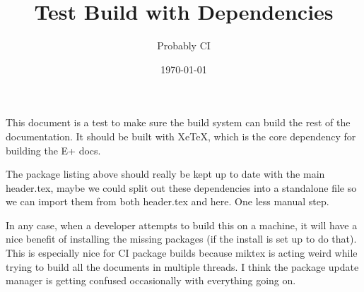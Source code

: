 \documentclass{report}
\title{Test Build with Dependencies}
\author{Probably CI}
\date{\today}
\begin{document}
    This document is a test to make sure the build system can build the rest of the documentation.
    It should be built with XeTeX, which is the core dependency for building the E+ docs.

    The package listing above should really be kept up to date with the main header.tex, maybe we could split out
    these dependencies into a standalone file so we can import them from both header.tex and here.
    One less manual step.

    In any case, when a developer attempts to build this on a machine, it will have a nice benefit of installing the missing packages (if the install is set up to do that).
    This is especially nice for CI package builds because miktex is acting weird while trying to build all the documents in multiple threads.
    I think the package update manager is getting confused occasionally with everything going on.
\end{document}
